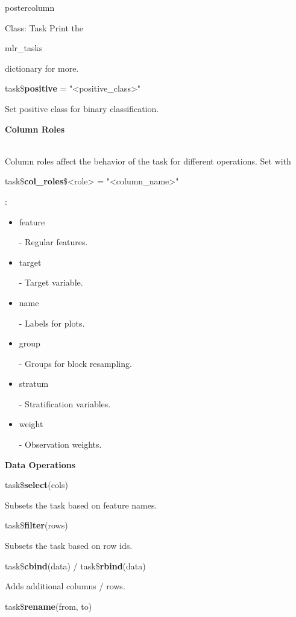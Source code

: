 \documentclass{beamer}
\newcommand{\codeinline}[1]{\begin{codeboxinline}#1\end{codeboxinline}}
\newcommand{\sectionheading}[1]{{\color{mlrblue}\large\raggedright\textbf{#1}}\vspace{1em}}
\begin{document}
\begin{frame}[fragile]{}
\begin{columns}
\begin{column}{.245\textwidth}
\begin{beamercolorbox}[center]{postercolumn}
\begin{minipage}{.98\textwidth}
{\begin{myblock}{Class: Task}
							\vspace{1em}
							Print the \codeinline{mlr\_tasks} dictionary for more.
							\vspace{0.5em}
							\begin{codebox}
								task\$\textbf{positive} = "<positive\_class>"
							\end{codebox}
							Set positive class for binary classification.
							\vspace{1em}
							\\
							\sectionheading{Column Roles}
							\\
							Column roles affect the behavior of the task for different operations.
							Set with
							\\
							\codeinline{task\$\textbf{col\_roles}\$<role> = "<column\_name>"}:
							\\
							\begin{itemize}
								\item \codeinline{feature} - Regular features.
								\item \codeinline{target} - Target variable.
								\item \codeinline{name} - Labels for plots.
								\item \codeinline{group} -  Groups for block resampling.
								\item \codeinline{stratum} - Stratification variables.
								\item \codeinline{weight} - Observation weights.
							\end{itemize}
							\vspace{1em}
							\sectionheading{Data Operations}
							\begin{codebox}
								task\$\textbf{select}(cols)
							\end{codebox}
							Subsets the task based on feature names.
							\\
							\begin{codebox}
								task\$\textbf{filter}(rows)
							\end{codebox}
							Subsets the task based on row ids.
							\\
							\begin{codebox}
								task\$\textbf{cbind}(data) / task\$\textbf{rbind}(data)
							\end{codebox}
							Adds additional columns / rows.
							\\
							\begin{codebox}
								task\$\textbf{rename}(from, to)
							\end{codebox}

\end{myblock}}
\end{minipage}
\end{beamercolorbox}
\end{column}
\end{columns}
\end{frame}
\end{document}
